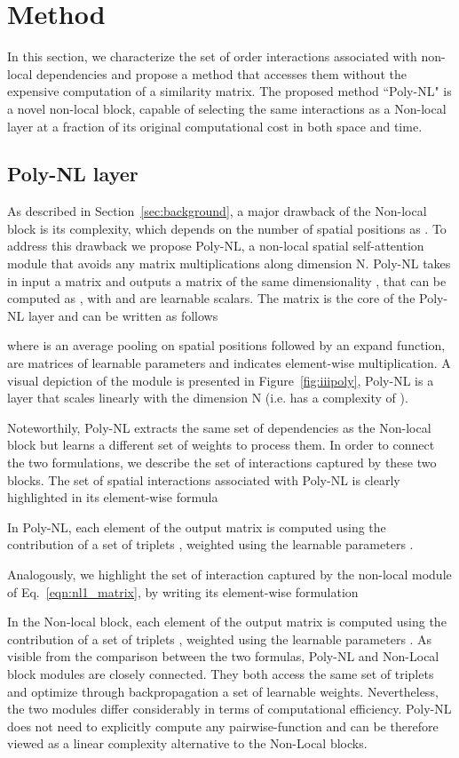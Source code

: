 \documentclass[10pt,twocolumn,letterpaper]{article}
\begin{document}
\section{Method}
In this section, we characterize the set of  order interactions associated with non-local dependencies and propose a method that accesses them without the expensive computation of a similarity matrix. The proposed method ``Poly-NL" is a novel non-local block, capable of selecting the same interactions as a Non-local layer at a fraction of its original computational cost in both space and time. 
\subsection{Poly-NL layer}
As described in Section~\ref{sec:background}, a major drawback of the Non-local block is its complexity, which depends on the number of spatial positions as .
To address this drawback we propose Poly-NL, a non-local spatial self-attention module that avoids any matrix multiplications along dimension N.  Poly-NL takes in input a matrix  and outputs a matrix of the same dimensionality , that can be computed as , with  and  are learnable scalars. The matrix  is the core of the Poly-NL layer and can be written as follows

where  is an average pooling on spatial positions followed by an expand function,  are matrices of learnable parameters and  indicates element-wise multiplication. A visual depiction of the module is presented in Figure~\ref{fig:iiipoly}, Poly-NL is a layer that scales linearly with the dimension N (i.e. has a complexity of ).

Noteworthily, Poly-NL extracts the same set of dependencies as the Non-local block but learns a different set of weights to process them. In order to connect the two formulations, we describe the set of interactions captured by these two blocks. 
The set of spatial interactions associated with Poly-NL is clearly highlighted in its element-wise formula


In Poly-NL, each element  of the output matrix is computed using the contribution of a set of triplets , weighted using the learnable parameters . 

Analogously, we highlight the set of interaction captured by the non-local module of Eq.~\eqref{eqn:nl1_matrix}, by writing its element-wise formulation

In the Non-local block, each element of the output matrix  is computed using the contribution of a set of triplets , weighted using the learnable parameters . As visible from the comparison between the two formulas, Poly-NL and Non-Local block modules are closely connected. They both access the same set of triplets and optimize through backpropagation a set of learnable weights. Nevertheless, the two modules differ considerably in terms of computational efficiency. Poly-NL does not need to explicitly compute any pairwise-function and can be therefore viewed as a linear complexity alternative to the Non-Local blocks.  
\end{document}
